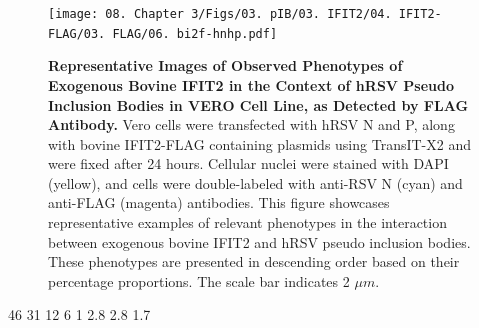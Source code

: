 \begin{figure}
    \centering
    \texttt{[image: 08. Chapter 3/Figs/03. pIB/03. IFIT2/04. IFIT2-FLAG/03. FLAG/06. bi2f-hnhp.pdf]}
    \caption[Representative Images of Observed Phenotypes of Exogenous Bovine IFIT2 in the Context of hRSV Pseudo Inclusion Bodies in VERO Cell Line, as Detected by FLAG Antibody.]{\textbf{Representative Images of Observed Phenotypes of Exogenous Bovine IFIT2 in the Context of hRSV Pseudo Inclusion Bodies in VERO Cell Line, as Detected by FLAG Antibody.} Vero cells were transfected with hRSV N and P, along with bovine IFIT2-FLAG containing plasmids using TransIT-X2 and were fixed after 24 hours. Cellular nuclei were stained with DAPI (yellow), and cells were double-labeled with anti-RSV N (cyan) and anti-FLAG (magenta) antibodies. This figure showcases representative examples of relevant phenotypes in the interaction between exogenous bovine IFIT2 and hRSV pseudo inclusion bodies. These phenotypes are presented in descending order based on their percentage proportions. The scale bar indicates 2 \(\mu m\).}
    \label{fig:Representative Images of Observed Phenotypes of Exogenous Bovine IFIT2 in the Context of hRSV Pseudo Inclusion Bodies in VERO Cell Line, as Detected by FLAG Antibody}
\end{figure}

46 31 12 6
1 2.8 2.8 1.7

